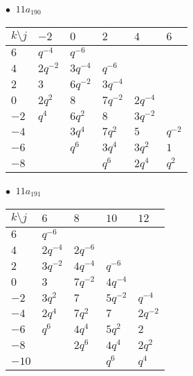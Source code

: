 \begin{minipage}{\linewidth}
$\bullet\ $ $11a_{190}$ \vspace{0.5em} \\
\begin{tabular}{l|lllll}
$k \setminus j$ & $-2$ & $0$ & $2$ & $4$ & $6$ \\
\hline
$6$ & $q^{-4}$ & $q^{-6}$ &  &  &  \\
$4$ & $2q^{-2}$ & $3q^{-4}$ & $q^{-6}$ &  &  \\
$2$ & $3$ & $6q^{-2}$ & $3q^{-4}$ &  &  \\
$0$ & $2q^{2}$ & $8$ & $7q^{-2}$ & $2q^{-4}$ &  \\
$-2$ & $q^{4}$ & $6q^{2}$ & $8$ & $3q^{-2}$ &  \\
$-4$ &  & $3q^{4}$ & $7q^{2}$ & $5$ & $q^{-2}$ \\
$-6$ &  & $q^{6}$ & $3q^{4}$ & $3q^{2}$ & $1$ \\
$-8$ &  &  & $q^{6}$ & $2q^{4}$ & $q^{2}$ \\
\end{tabular}
\vspace{2em}
\end{minipage}
%
\begin{minipage}{\linewidth}
$\bullet\ $ $11a_{191}$ \vspace{0.5em} \\
\begin{tabular}{l|llll}
$k \setminus j$ & $6$ & $8$ & $10$ & $12$ \\
\hline
$6$ & $q^{-6}$ &  &  &  \\
$4$ & $2q^{-4}$ & $2q^{-6}$ &  &  \\
$2$ & $3q^{-2}$ & $4q^{-4}$ & $q^{-6}$ &  \\
$0$ & $3$ & $7q^{-2}$ & $4q^{-4}$ &  \\
$-2$ & $3q^{2}$ & $7$ & $5q^{-2}$ & $q^{-4}$ \\
$-4$ & $2q^{4}$ & $7q^{2}$ & $7$ & $2q^{-2}$ \\
$-6$ & $q^{6}$ & $4q^{4}$ & $5q^{2}$ & $2$ \\
$-8$ &  & $2q^{6}$ & $4q^{4}$ & $2q^{2}$ \\
$-10$ &  &  & $q^{6}$ & $q^{4}$ \\
\end{tabular}
\vspace{2em}
\end{minipage}
%
